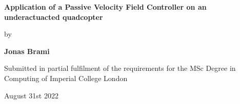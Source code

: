 \begin{titlepage}
    \begin{center}
        \vspace*{1cm}
 
        \textbf{Application of a Passive Velocity Field Controller on an underactuacted quadcopter}
 
        \vspace{0.5cm}
         
        by     
        \vspace{1.5cm}
 
        \textbf{Jonas Brami}
 
        \vfill
             
        Submitted in partial fulfilment of the requirements for the MSc Degree in \\Computing of Imperial College London
             
        \vspace{0.8cm}
      
             
        August 31st 2022
             
    \end{center}
 \end{titlepage}
\clearpage
%
%

\ 
\vspace{1cm}

\begin{minipage}{\textwidth}
    \tableofcontents
\end{minipage}
\clearpage